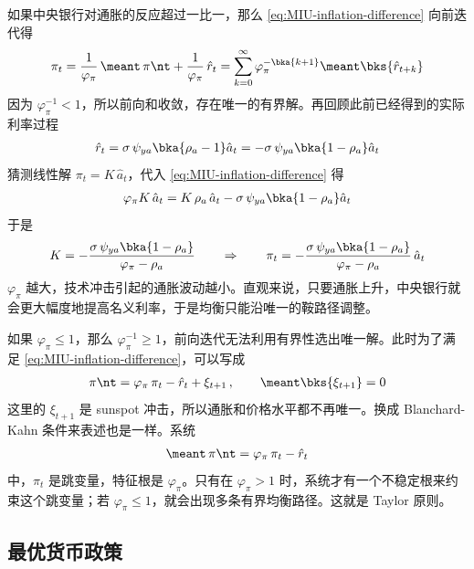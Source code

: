 \myskip
{}

如果中央银行对通胀的反应超过一比一，那么 \ref{eq:MIU-inflation-difference} 向前迭代得
\begin{align*}
    \pi_t
    =\dfrac{1}{\varphi_\pi}\,\meant\,\pi\nt+\dfrac{1}{\varphi_\pi}\,\hat r_t
    =\sum^\infty_{k=0}\varphi_\pi^{-\bka{k+1}}\meant\bks{\hat r_{t+k}}
\end{align*}
因为 \(\varphi_\pi^{-1}<1\)，所以前向和收敛，存在唯一的有界解。再回顾此前已经得到的实际利率过程
\begin{align*}
    \hat r_t=\sigma\,\psi_{ya}\bka{\rho_a-1}\hat a_t=-\sigma\,\psi_{ya}\bka{1-\rho_a}\hat a_t
\end{align*}
猜测线性解 \(\pi_t=K\,\hat a_t\)，代入 \ref{eq:MIU-inflation-difference} 得
\begin{align*}
    \varphi_\pi K\,\hat a_t
    =K\,\rho_a\,\hat a_t-\sigma\,\psi_{ya}\bka{1-\rho_a}\hat a_t
\end{align*}
于是
\begin{align*}
    K=-\dfrac{\sigma\,\psi_{ya}\bka{1-\rho_a}}{\varphi_\pi-\rho_a}
    \qquad\Rightarrow\qquad
    \pi_t=-\dfrac{\sigma\,\psi_{ya}\bka{1-\rho_a}}{\varphi_\pi-\rho_a}\,\hat a_t
\end{align*}
\(\varphi_\pi\) 越大，技术冲击引起的通胀波动越小。直观来说，只要通胀上升，中央银行就会更大幅度地提高名义利率，于是均衡只能沿唯一的鞍路径调整。

\myskip
{}

如果 \(\varphi_\pi\le1\)，那么 \(\varphi_\pi^{-1}\ge1\)，前向迭代无法利用有界性选出唯一解。此时为了满足 \ref{eq:MIU-inflation-difference}，可以写成
\begin{align*}
    \pi\nt=\varphi_\pi\,\pi_t-\hat r_t+\xi_{t+1}\,,\qquad \meant\bks{\xi_{t+1}}=0
\end{align*}
这里的 \(\xi_{t+1}\) 是 sunspot 冲击，所以通胀和价格水平都不再唯一。换成 Blanchard-Kahn 条件来表述也是一样。系统
\begin{align*}
    \meant\,\pi\nt=\varphi_\pi\,\pi_t-\hat r_t
\end{align*}
中，\(\pi_t\) 是跳变量，特征根是 \(\varphi_\pi\)。只有在 \(\varphi_\pi>1\) 时，系统才有一个不稳定根来约束这个跳变量；若 \(\varphi_\pi\le1\)，就会出现多条有界均衡路径。这就是 Taylor 原则。

\subsection{最优货币政策}

